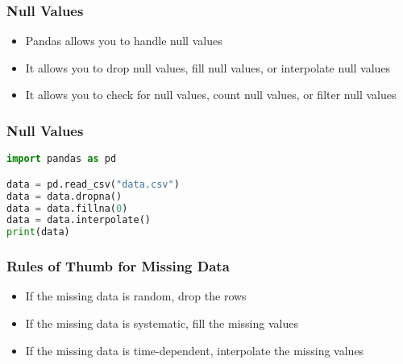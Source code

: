 \documentclass[serif, 9pt, aspectratio=32]{beamer}
\begin{document}
\begin{frame}
    \centering
    \frametitle{Null Values}
    \begin{itemize}
        \setlength{\itemsep}{2em}
        \item Pandas allows you to handle null values
        \item It allows you to drop null values, fill null values, or interpolate null values
        \item It allows you to check for null values, count null values, or filter null values
    \end{itemize}
\end{frame}

\begin{frame}[fragile]
    \frametitle{Null Values}
    \begin{lstlisting}[language=Python]
import pandas as pd

data = pd.read_csv("data.csv")
data = data.dropna()
data = data.fillna(0)
data = data.interpolate()
print(data)
    \end{lstlisting}
\end{frame}

\begin{frame}
    \centering
    \frametitle{Rules of Thumb for Missing Data}
    \begin{itemize}
        \setlength{\itemsep}{2em}
        \item If the missing data is random, drop the rows
        \item If the missing data is systematic, fill the missing values
        \item If the missing data is time-dependent, interpolate the missing values
    \end{itemize}
\end{frame}
\end{document}
